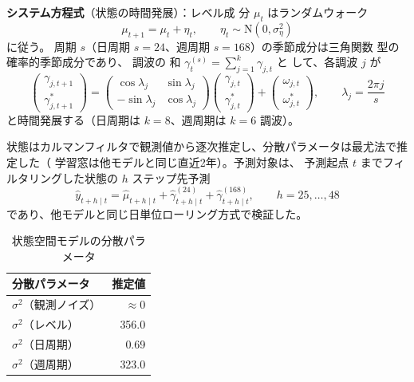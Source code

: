 \documentclass[a4paper,11pt]{ltjsarticle}
\begin{document}
\textbf{システム方程式}（状態の時間発展）：レベル成
分 $\mu_t$ はランダムウォーク
\begin{equation*}
  \mu_{t+1} = \mu_t + \eta_t, \qquad \eta_t \sim \mathrm{N}(0, \sigma^2_\eta)
\end{equation*}
に従う。
周期 $s$（日周期 $s=24$、週周期 $s=168$）の季節成分は三角関数
型の確率的季節成分であり、
調波の
和 $\gamma^{(s)}_t = \sum_{j=1}^{k} \gamma_{j,t}$ と
して、各調波 $j$ が
\begin{equation*}
  \begin{pmatrix} \gamma_{j,t+1} \\ \gamma^{*}_{j,t+1} \end{pmatrix}
  =
  \begin{pmatrix} \cos\lambda_j & \sin\lambda_j \\ -\sin\lambda_j & \cos\lambda_j \end{pmatrix}
  \begin{pmatrix} \gamma_{j,t} \\ \gamma^{*}_{j,t} \end{pmatrix}
  +
  \begin{pmatrix} \omega_{j,t} \\ \omega^{*}_{j,t} \end{pmatrix},
  \qquad \lambda_j = \frac{2\pi j}{s}
\end{equation*}
と時間発展する（日周期は $k=8$、週周期は $k=6$ 調波）。

状態はカルマンフィルタで観測値から逐次推定し、分散パラメータは最尤法で推定した（
学習窓は他モデルと同じ直近2年）。予測対象は、
予測起点 $t$ までフィルタリングした状態の $h$ ステップ先予測
\begin{equation*}
  \hat{y}_{t+h\mid t} = \hat{\mu}_{t+h\mid t} + \hat{\gamma}^{(24)}_{t+h\mid t} + \hat{\gamma}^{(168)}_{t+h\mid t},
  \qquad h = 25, \dots, 48
\end{equation*}
であり、他モデルと同じ日単位ローリング方式で検証した。

\begin{table}[htbp]
  \centering
  \caption{状態空間モデルの分散パラメータ}
  \begin{tabular}{lr}
    \toprule
    分散パラメータ & 推定値 \\
    \midrule
    $\sigma^2$（観測ノイズ） & $\approx 0$ \\
    $\sigma^2$（レベル） & 356.0 \\
    $\sigma^2$（日周期） & 0.69 \\
    $\sigma^2$（週周期） & 323.0 \\
    \bottomrule
  \end{tabular}
\end{table}
\end{document}
